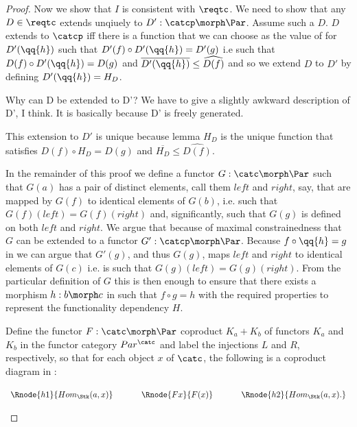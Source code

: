 \begin{proof}
Now we show that $I$ is consistent with $\reqtc$. 
We need to show that any $D \in \reqtc$
extends unqiuely to $D' :\catcp \morph \Par$. Assume such a $D$. 
$D$  extends to $\catcp$ iff there is a  function that we can choose as the value of  for $D'(\qq{h})$  such that $D'(f) \circ D'(\qq{h}) = D'(g)$ i.e such that
$D(f) \circ D'(\qq{h}) = D(g)$ and $\overline{D'(\qq{h})}\leq \widehat{D(f)}$
and so we  extend $D$ to $D'$ 
 by defining $D'(\qq{h})=H_D$. 

\begin{worktt}Why can D be extended to D'?
We have to give a slightly awkward description of D', I think.
It is basically because D' is freely generated. 
\end{worktt} 
This extension to $D'$ is unique because 
lemma 
$H_D$ is the unique function 
that satisfies $D(f) \circ H_D = D(g)$ and $\overline{H_D}\leq \widehat{D(f)}$.

In the remainder of this proof 
we define a functor $G: \catc \morph \Par$ such that
$G(a)$ has a pair of distinct elements, call them $left$ and $right$, say,  that are mapped by $G(f)$ to identical elements
of $G(b)$, i.e. such that $G(f)(left)= G(f)(right)$ and, significantly,
such that $G(g)$ is defined on both $left$ and $right$.   
We  argue that because of  maximal constrainedness that $G$ can be extended to a functor 
$G' : \catcp \morph \Par$. 
Because $f \circ \qq{h} = g$ in \catcpw we can argue that $G'(g)$,
and thus $G(g)$,
maps $left$ and $right$ to identical elements of $G(c)$ 
i.e. is such that $G(g)(left)= G(g)(right)$. 
From the particular definition of $G$ this  is then enough 
to ensure that there exists a morphism $h:b \morph c$ in \catcw
such that $f \circ g = h$
 with the required properties to represent the functionality dependency $H$.

Define the functor $F: \catc \morph \Par$ 
coproduct $K_a + K_b$ of functors $K_a$ and $K_b$ in the functor category $Par^{\catc}$ and label the injections $L$ and $R$, respectively,
so that for each object $x$ of $\catc$, the following is a coproduct diagram
in \Par:
\begin{center}
$
\begin{array}{c p{0.5cm} c p{0.5cm} c  }
\Rnode{h1}{Hom_{\Stk}(a,x)}  &&\Rnode{Fx}{F(x)}  &&   \Rnode{h2}{Hom_{\Stk}(a,x).}       
\end{array} 
$
\end{center} 


\end{proof}
